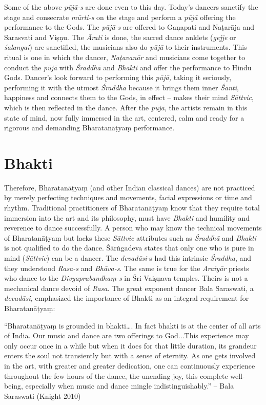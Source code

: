 Some of the above \textit{pūjā-s} are done even to this day. Today’s dancers sanctify the stage and consecrate \textit{mūrti-s} on the stage and perform a \textit{pūjā} offering the performance to the Gods. The \textit{pūjā-s }are offered to Gaṇapati and Naṭarāja and Sarasvati and Viṣṇu. The \textit{Ārati} is done, the sacred dance anklets (\textit{gejje} or \textit{śalangai}) are sanctified, the musicians also do \textit{pūjā }to their instruments. This ritual is one in which the dancer, \textit{Naṭavanār} and musicians come together to conduct the \textit{pūjā }with \textit{Śraddhā} and \textit{Bhakti} and offer the performance to Hindu Gods. Dancer’s look forward to performing this \textit{pūjā,} taking it seriously, performing it with the utmost \textit{Śraddhā} because it brings them inner \textit{Śānti}, happiness and connects them to the Gods, in effect – makes their mind \textit{Sāttvic}, which is then reflected in the dance. After the \textit{pūjā}, the artists remain in this state of mind, now fully immersed in the art, centered, calm and ready for a rigorous and demanding Bharatanāṭyaṃ performance.


\section*{Bhakti}

Therefore, Bharatanāṭyaṃ (and other Indian classical dances) are not practiced by merely perfecting techniques and movements, facial expressions or time and rhythm. Traditional practitioners of Bharatanāṭyaṃ know that they require total immersion into the art and its philosophy, must have \textit{Bhakti} and humility and reverence to dance successfully. A person who may know the technical movements of Bharatanāṭyaṃ but lacks these \textit{Sāttvic} attributes such as \textit{Śraddhā} and \textit{Bhakti} is not qualified to do the dance. Śārṅgadeva states that only one who is pure in mind (\textit{Sāttvic}) can be a dancer. The \textit{devadāsi}-s had this intrinsic \textit{Śraddha}, and they understood \textit{Rasa-s} and\textit{ Bhāva-s}. The same is true for the \textit{Araiyār} priests who dance to the \textit{Divyaprabandhaṃ-s} in Śri Vaiṣṇava temples. Theirs is not a mechanical dance devoid of \textit{Rasa}. The great exponent dancer Bala Saraswati, a \textit{devadāsi,} emphasized the importance of Bhakti as an integral requirement for Bharatanāṭyaṃ:

\begin{myquote}
“Bharatanāṭyaṃ is grounded in bhakti…. In fact bhakti is at the center of all arts of India. Our music and dance are two offerings to God...This experience may only occur once in a while but when it does for that little duration, its grandeur enters the soul not transiently but with a sense of eternity. As one gets involved in the art, with greater and greater dedication, one can continuously experience throughout the few hours of the dance, the unending joy, this complete well-being, especially when music and dance mingle indistinguishably.” – Bala Saraswati (Knight 2010)
\end{myquote}

